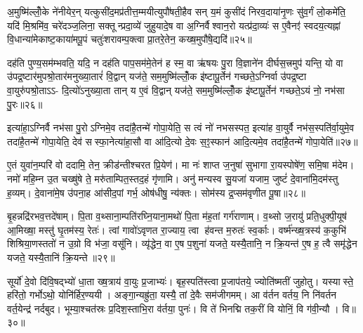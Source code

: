 अ॒मुष्मि॑ल्लोँ॒के ने॑नीयेर॒न् यत्कुसी॑द॒मप्र॑तीत्त॒म्मयीत्युपौ॑षती॒हैव सन् य॒मं कुसी॑दं निरव॒दाया॑नृ॒णः सु॑व॒र्गं लो॒कमे॑ति॒ यदि॑ मि॒श्रमि॑व॒ चरे॑दञ्ज॒लिना॒ सक्तून्प्रदा॒व्ये॑ जुहुयादे॒ष वा अ॒ग्निर्वैश्वान॒रो यत्प्र॑दा॒व्यः॑ स ए॒वैनꣵ॑ स्वदय॒त्यह्नां वि॒धान्या॑मेकाष्ट॒काया॑मपू॒पं चतुः॑शरावम्प॒क्त्वा प्रा॒तरे॒तेन॒ कख्ष॒मुपौ॑षे॒द्यदि॑॥२५॥

दह॑ति पुण्य॒सम॑म्भवति॒ यदि॒ न दह॑ति पाप॒सम॑मे॒तेन॑ ह स्म॒ वा ऋ॑षयः पु॒रा वि॒ज्ञाने॑न दीर्घस॒त्त्रमुप॑ यन्ति॒ यो वा उ॑पद्र॒ष्टार॑मुपश्रो॒तार॑मनुख्या॒तारं॑ वि॒द्वान् यज॑ते॒ सम॒मुष्मि॑ल्लोँ॒क इ॑ष्टापू॒र्तेन॑ गच्छते॒ऽग्निर्वा उ॑पद्र॒ष्टा वा॒युरु॑पश्रो॒ताऽऽ- दि॒त्यो॑ऽनुख्या॒ता तान् य ए॒वं वि॒द्वान् यज॑ते॒ सम॒मुष्मि॑ल्लोँ॒क इ॑ष्टापू॒र्तेन॑ गच्छते॒ऽयं नो॒ नभ॑सा पु॒रः॥२६॥

इत्या॑हा॒ऽग्निर्वै नभ॑सा पु॒रोऽग्निमे॒व तदा॑है॒तन्मे॑ गोपा॒येति॒ स त्वं नो॑ नभसस्पत॒ इत्या॑ह वा॒युर्वै नभ॑स॒स्पति॑र्वा॒युमे॒व तदा॑है॒तन्मे॑ गोपा॒येति॒ देव॑ सस्फा॒नेत्या॑हा॒सौ वा आ॑दि॒त्यो दे॒वः स॒ꣵ॒स्फान॑ आदि॒त्यमे॒व तदा॑है॒तन्मे॑ गोपा॒येति॑॥२७॥

{\anuvakamend[{कुसी॑द॒न्त्वन्न॑ एनमोषे॒द्यदि॑ पु॒र आ॑दि॒त्यमे॒व तदा॑है॒तन्मे॑ गोपा॒येति॑॥८॥}]}

ए॒तं युवा॑न॒म्परि॑ वो ददामि॒ तेन॒ क्रीड॑न्तीश्चरत प्रि॒येण॑। मा नः॑ शाप्त ज॒नुषा॑ सुभागा रा॒यस्पोषे॑ण॒ समि॒षा म॑देम। नमो॑ महि॒म्न उ॒त चख्षु॑षे ते॒ मरु॑ताम्पित॒स्तद॒हं गृ॑णामि। अनु॑ मन्यस्व सु॒यजा॑ यजाम॒ जुष्टं॑ दे॒वाना॑मि॒दम॑स्तु ह॒व्यम्। दे॒वाना॑मे॒ष उ॑पना॒ह आ॑सीद॒पां गर्भ॒ ओष॑धीषु॒ न्य॑क्तः। सोम॑स्य द्र॒प्सम॑वृणीत पू॒षा॥२८॥

बृ॒हन्नद्रि॑रभव॒त्तदे॑षाम्। पि॒ता व॒थ्साना॒म्पति॑रघ्नि॒याना॒मथो॑ पि॒ता म॑ह॒तां गर्ग॑राणाम्। व॒थ्सो ज॒रायु॑ प्रति॒धुक्पी॒यूष॑ आ॒मिख्षा॒ मस्तु॑ घृ॒तम॑स्य॒ रेतः॑। त्वां गावो॑ऽवृणत रा॒ज्याय॒ त्वा ह॑वन्त म॒रुतः॑ स्व॒र्काः। वर्ष्म॑न्ख्ष॒त्रस्य॑ क॒कुभि॑ शिश्रिया॒णस्ततो॑ न उ॒ग्रो वि भ॑जा॒ वसू॑नि। व्यृ॑द्धेन॒ वा ए॒ष प॒शुना॑ यजते॒ यस्यै॒तानि॒ न क्रि॒यन्त॑ ए॒ष ह॒ त्वै समृ॑द्धेन यजते॒ यस्यै॒तानि॑ क्रि॒यन्ते॥२९॥

{\anuvakamend[{पू॒षा क्रि॒यन्त॑ ए॒षोऽष्टौ च॑॥९॥}]}

सूर्यो॑ दे॒वो दि॑वि॒षद्भ्यो॑ धा॒ता ख्ष॒त्राय॑ वा॒युः प्र॒जाभ्यः॑। बृह॒स्पति॑स्त्वा प्र॒जाप॑तये॒ ज्योति॑ष्मतीं जुहोतु। यस्यास्ते॒ हरि॑तो॒ गर्भोऽथो॒ योनि॑र्\mbox{}हिर॒ण्ययी। अङ्गा॒न्यह्रु॑ता॒ यस्यै॒ तां दे॒वैः सम॑जीगमम्। आ व॑र्तन वर्तय॒ नि नि॑वर्तन वर्त॒येन्द्र॑ नर्दबुद। भूम्या॒श्चत॑स्रः प्र॒दिश॒स्ताभि॒रा व॑र्तया॒ पुनः॑। वि ते॑ भिनद्मि तक॒रीं वि योनिं॒ वि ग॑वी॒न्यौ। वि॥३०॥

